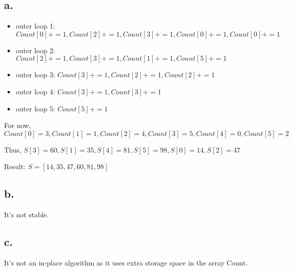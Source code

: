 \documentclass{article}
\begin{document}
\subsection*{a.}

\begin{itemize}
\item outer loop 1: $Count[0] += 1, Count[2] += 1, Count[3] += 1, Count[0] += 1, Count[0] += 1$
\item outer loop 2: $Count[2] += 1, Count[3] += 1, Count[1] += 1, Count[5] += 1$
\item outer loop 3: $Count[3] += 1, Count[2] += 1, Count[2] += 1$
\item outer loop 4: $Count[3] += 1, Count[3] += 1$
\item outer loop 5: $Count[5] += 1$
\end{itemize}

For now, $Count[0] =3, Count[1] =1, Count[2] =4, Count[3] =5, Count[4] =0, Count[5] =2$

Thus, $S[3] = 60, S[1] = 35, S[4] = 81 , S[5] = 98 , S[0] = 14 , S[2] = 47$

Result: $S =[14,35,47,60,81,98]$

\subsection*{b.}

It's not stable.

\subsection*{c.}

It's not an in-place algorithm as it uses extra storage space in the array Count.
\end{document}
